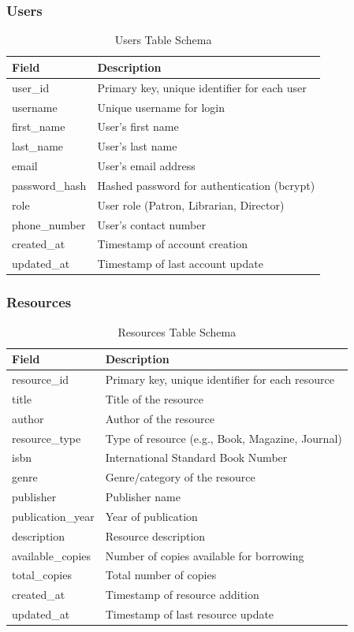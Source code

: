 \documentclass[11pt,a4paper]{article}
\begin{document}
\subsubsection{Users}

\begin{table}[h]
\centering
\begin{tabular}{@{}ll@{}}
\toprule
\textbf{Field} & \textbf{Description} \\
\midrule
user\_id & Primary key, unique identifier for each user \\
username & Unique username for login \\
first\_name & User's first name \\
last\_name & User's last name \\
email & User's email address \\
password\_hash & Hashed password for authentication (bcrypt) \\
role & User role (Patron, Librarian, Director) \\
phone\_number & User's contact number \\
created\_at & Timestamp of account creation \\
updated\_at & Timestamp of last account update \\
\bottomrule
\end{tabular}
\caption{Users Table Schema}
\end{table}

\subsubsection{Resources}

\begin{table}[h]
\centering
\begin{tabular}{@{}ll@{}}
\toprule
\textbf{Field} & \textbf{Description} \\
\midrule
resource\_id & Primary key, unique identifier for each resource \\
title & Title of the resource \\
author & Author of the resource \\
resource\_type & Type of resource (e.g., Book, Magazine, Journal) \\
isbn & International Standard Book Number \\
genre & Genre/category of the resource \\
publisher & Publisher name \\
publication\_year & Year of publication \\
description & Resource description \\
available\_copies & Number of copies available for borrowing \\
total\_copies & Total number of copies \\
created\_at & Timestamp of resource addition \\
updated\_at & Timestamp of last resource update \\
\bottomrule
\end{tabular}
\caption{Resources Table Schema}
\end{table}
\end{document}
